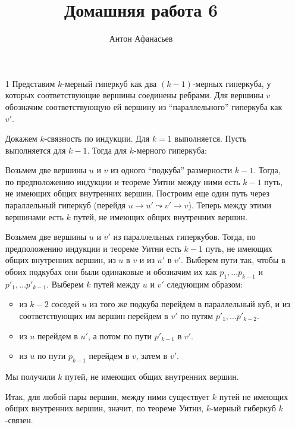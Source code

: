 \documentclass[10pt]{article}
\begin{document}
\title{Домашняя работа 6}
\author{Антон Афанасьев}
\maketitle

\begin{enumerate}
\item[1] Представим $k$-мерный гиперкуб как два $(k-1)$-мерных гиперкуба, у которых соответствующие вершины соединены ребрами. Для вершины $v$ обозначим соответствующую ей вершину из ``параллельного'' гиперкуба как $v'$. 

Докажем $k$-связность по индукции. Для $k=1$ выполняется. Пусть выполняется для $k-1$. Тогда для $k$-мерного гиперкуба:

Возьмем две вершины $u$ и $v$ из одного ``подкуба'' размерности $k-1$. Тогда, по предположению индукции и теореме Уитни между ними есть $k-1$ путь, не имеющих общих внутренних вершин. Построим еще один путь через параллельный гиперкуб (перейдя $u \to u' \leadsto v' \to v$). Теперь между этими вершинами есть $k$ путей, не имеющих общих внутренних вершин.

Возьмем две вершины $u$ и $v'$ из параллельных гиперкубов. Тогда, по предположению индукции  и теореме Уитни есть $k-1$ путь, не имеющих общих внутренних вершин, из $u$ в $v$ и из $u'$ в $v'$. Выберем пути так, чтобы в обоих подкубах они были одинаковые и обозначим их как $p_1, \ldots p_{k-1}$ и $p'_1, \ldots p'_{k-1}$. Выберем $k$ путей между $u$ и $v'$ следующим образом: 
\begin{itemize}
\item из $k-2$ соседей $u$ из того же подкуба перейдем в параллельный куб, и из соответствующих им вершин перейдем в $v'$ по путям $p'_1, \ldots p'_{k-2}$.
\item из $u$ перейдем в $u'$, а потом по пути $p'_{k-1}$ в $v'$.
\item из $u$ по пути $p_{k-1}$ перейдем в $v$, затем в $v'$.
\end{itemize}
Мы получили $k$ путей, не имеющих общих внутренних вершин.

Итак, для любой пары вершин, между ними существует $k$ путей не имеющих общих внутренних вершин, значит, по теореме Уитни, $k$-мерный гиберкуб $k$-связен.

\end{enumerate}
\end{document}

